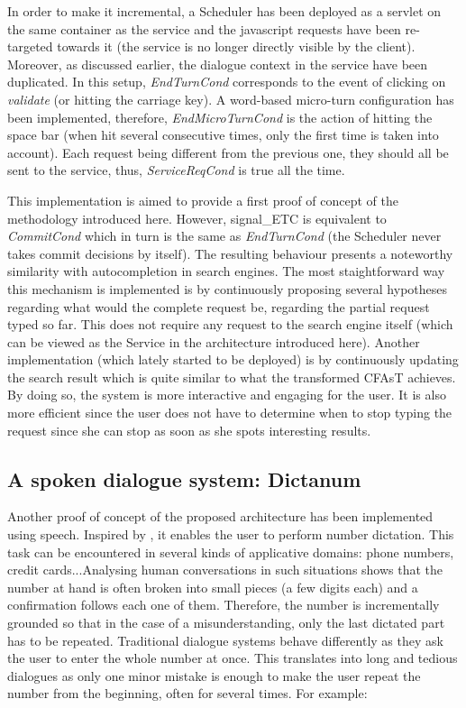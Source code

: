         In order to make it incremental, a Scheduler has been deployed as a servlet on the same container as the service and the javascript requests have been re-targeted towards it (the service is no longer directly visible by the client). Moreover, as discussed earlier, the dialogue context in the service have been duplicated. In this setup, \textit{EndTurnCond} corresponds to the event of clicking on \textit{validate} (or hitting the carriage key). A word-based micro-turn configuration has been implemented, therefore, \textit{EndMicroTurnCond} is the action of hitting the space bar (when hit several consecutive times, only the first time is taken into account). Each request being different from the previous one, they should all be sent to the service, thus, \textit{ServiceReqCond} is true all the time.
        
        This implementation is aimed to provide a first proof of concept of the methodology introduced here. However, signal\_ETC is equivalent to \textit{CommitCond} which in turn is the same as \textit{EndTurnCond} (the Scheduler never takes commit decisions by itself). The resulting behaviour presents a noteworthy similarity with autocompletion in search engines. The most staightforward way this mechanism is implemented is by continuously proposing several hypotheses regarding what would the complete request be, regarding the partial request typed so far. This does not require any request to the search engine itself (which can be viewed as the Service in the architecture introduced here). Another implementation (which lately started to be deployed) is by continuously updating the search result which is quite similar to what the transformed CFAsT achieves. By doing so, the system is more interactive and engaging for the user. It is also more efficient since the user does not have to determine when to stop typing the request since she can stop as soon as she spots interesting results.
    
    \subsection{A spoken dialogue system: Dictanum}
    
    	Another proof of concept of the proposed architecture has been implemented using speech. Inspired by \cite{Skantze2009}, it enables the user to perform number dictation. This task can be encountered in several kinds of applicative domains: phone numbers, credit cards...Analysing human conversations in such situations shows that the number at hand is often broken into small pieces (a few digits each) and a confirmation follows each one of them. Therefore, the number is incrementally grounded so that in the case of a misunderstanding, only the last dictated part has to be repeated. Traditional dialogue systems behave differently as they ask the user to enter the whole number at once. This translates into long and tedious dialogues as only one minor mistake is enough to make the user repeat the number from the beginning, often for several times. For example:
        
